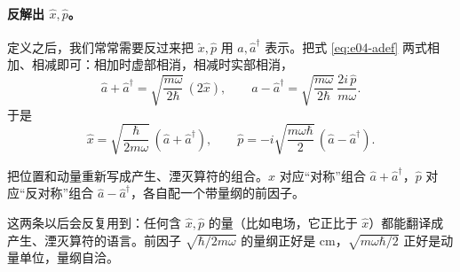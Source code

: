 \paragraph{反解出 \(\hat x,\hat p\)。}
定义之后，我们常常需要反过来把 \(\hat x,\hat p\) 用 \(\hat a,\hat a^\dagger\) 表示。把式 \eqref{eq:e04-adef} 两式相加、相减即可：相加时虚部相消，相减时实部相消，
\[
  \hat a+\hat a^\dagger=\sqrt{\frac{m\omega}{2\hbar}}\,(2\hat x),
  \qquad
  \hat a-\hat a^\dagger=\sqrt{\frac{m\omega}{2\hbar}}\,\frac{2i\,\hat p}{m\omega}.
\]
于是
\begin{equation}
  \hat x=\sqrt{\frac{\hbar}{2m\omega}}\,(\hat a+\hat a^\dagger),
  \qquad
  \hat p=-i\sqrt{\frac{m\omega\hbar}{2}}\,(\hat a-\hat a^\dagger).
  \label{eq:e04-xp-in-a}
\end{equation}
\begin{formulaexplain}
把位置和动量重新写成产生、湮灭算符的组合。\(\hat x\) 对应“对称”组合 \(\hat a+\hat a^\dagger\)，\(\hat p\) 对应“反对称”组合 \(\hat a-\hat a^\dagger\)，各自配一个带量纲的前因子。
\end{formulaexplain}
这两条以后会反复用到：任何含 \(\hat x,\hat p\) 的量（比如电场，它正比于 \(\hat x\)）都能翻译成产生、湮灭算符的语言。前因子 \(\sqrt{\hbar/2m\omega}\) 的量纲正好是 cm，\(\sqrt{m\omega\hbar/2}\) 正好是动量单位，量纲自洽。

